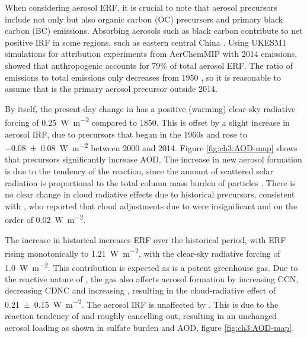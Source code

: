 When considering aerosol ERF, it is crucial to note that aerosol precursors include not only  but also organic carbon (OC) precursors and primary black carbon (BC) emissions. Absorbing aerosols such as black carbon contribute to net positive IRF in some regions, such as eastern central China \citep{seoImpactsAerosolEmissions2020, oconnorAssessmentPreindustrialPresentday2021}. Using UKESM1 simulations for attribution experiments from AerChemMIP with 2014 emissions, \citet{oconnorAssessmentPreindustrialPresentday2021} showed that anthropogenic  accounts for 79\% of total aerosol ERF. The ratio of  emissions to total emissions only decreases from 1950 \citep{hoeslyHistorical175020142018}, so it is reasonable to assume that  is the primary aerosol precursor outside 2014. 

By itself, the present-day change in  has a positive (warming) clear-sky radiative forcing of \qty{0.25}{\watt\per\metre\squared} compared to 1850. This is offset by a slight increase in aerosol IRF, due to  precursors that began in the 1960s and rose to \qty{-0.08+-0.08}{\watt\per\metre\squared} between 2000 and 2014. Figure \ref{fig:ch3:AOD-map} shows that  precursors significantly increase AOD. The increase in new aerosol formation is due to the tendency of the  reaction, since the amount of scattered solar radiation is proportional to the total column mass burden of particles \citep{nemesureDirectShortwaveForcing1995}. There is no clear change in cloud radiative effects due to historical  precursors, consistent with \citet{skeieHistoricalTotalOzone2020}, who reported that cloud adjustments due to  were insignificant and on the order of \qty{0.02}{\watt\per\metre\squared}. 

The increase in historical  increases ERF over the historical period, with ERF rising monotonically to \qty{1.21}{\watt\per\metre\squared}, with the clear-sky radiative forcing of \qty{1.0}{\watt\per\metre\squared}. This \ERFcsclean{} contribution is expected as  is a potent greenhouse gas. Due to the reactive nature of , the gas also affects aerosol formation by increasing CCN, decreasing CDNC and increasing \Reff{}, resulting in the cloud-radiative effect of \qty{0.21+-0.15}{\watt\per\metre\squared}. The aerosol IRF is unaffected by . This is due to the reaction tendency of  and  roughly cancelling out, resulting in an unchanged aerosol loading as shown in sulfate burden and AOD, figure \ref{fig:ch3:AOD-map}. 


